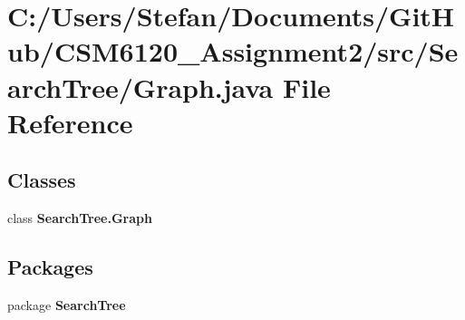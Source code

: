 \section{C\+:/\+Users/\+Stefan/\+Documents/\+Git\+Hub/\+C\+S\+M6120\+\_\+\+Assignment2/src/\+Search\+Tree/\+Graph.java File Reference}
\label{_graph_8java}
\subsection*{Classes}
\begin{DoxyCompactItemize}
\item 
class {\bf Search\+Tree.\+Graph}
\end{DoxyCompactItemize}
\subsection*{Packages}
\begin{DoxyCompactItemize}
\item 
package {\bf Search\+Tree}
\end{DoxyCompactItemize}
